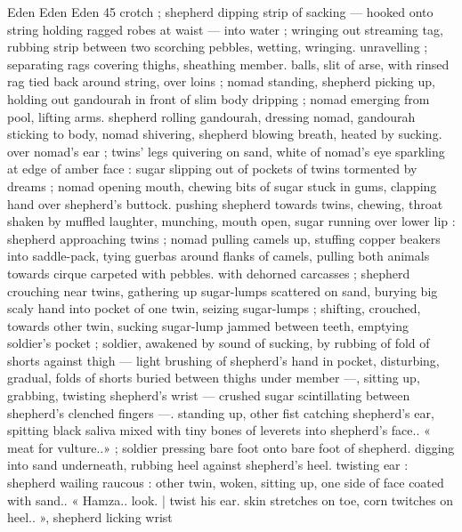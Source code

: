 Eden Eden Eden 45
crotch ; shepherd dipping strip of sacking — hooked onto string
holding ragged robes at waist — into water ; wringing out streaming
tag, rubbing strip between two scorching pebbles, wetting, wringing.
unravelling ; separating rags covering thighs, sheathing member.
balls, slit of arse, with rinsed rag tied back around string, over loins
; nomad standing, shepherd picking up, holding out gandourah in
front of slim body dripping ; nomad emerging from pool, lifting arms.
shepherd rolling gandourah, dressing nomad, gandourah sticking to
body, nomad shivering, shepherd blowing breath, heated by sucking.
over nomad's ear ; twins’ legs quivering on sand, white of nomad's
eye sparkling at edge of amber face : sugar slipping out of pockets
of twins tormented by dreams ; nomad opening mouth, chewing bits
of sugar stuck in gums, clapping hand over shepherd's buttock.
pushing shepherd towards twins, chewing, throat shaken by muffled
laughter, munching, mouth open, sugar running over lower lip :
shepherd approaching twins ; nomad pulling camels up, stuffing
copper beakers into saddle-pack, tying guerbas around flanks of
camels, pulling both animals towards cirque carpeted with pebbles.
with dehorned carcasses ; shepherd crouching near twins, gathering
up sugar-lumps scattered on sand, burying big scaly hand into
pocket of one twin, seizing sugar-lumps ; shifting, crouched, towards
other twin, sucking sugar-lump jammed between teeth, emptying
soldier's pocket ; soldier, awakened by sound of sucking, by rubbing
of fold of shorts against thigh — light brushing of shepherd's hand
in pocket, disturbing, gradual, folds of shorts buried between thighs
under member —, sitting up, grabbing, twisting shepherd's wrist —
crushed sugar scintillating between shepherd's clenched fingers —.
standing up, other fist catching shepherd's ear, spitting black saliva
mixed with tiny bones of leverets into shepherd's face.. « meat for
vulture..» ; soldier pressing bare foot onto bare foot of shepherd.
digging into sand underneath, rubbing heel against shepherd's heel.
twisting ear : shepherd wailing raucous : other twin, woken, sitting
up, one side of face coated with sand.. « Hamza.. look. | twist his ear.
skin stretches on toe, corn twitches on heel.. », shepherd licking wrist

